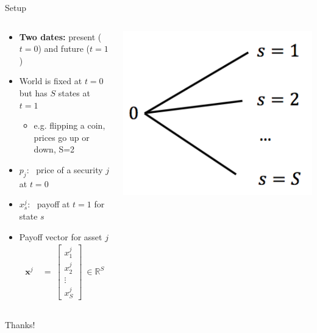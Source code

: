 \documentclass[9pt]{beamer}
\newcommand{\eq}{\ =\ }
\newcommand{\bb}{\mathbb}
\begin{document}
\begin{frame}{Setup}
\begin{columns}
\begin{column}{0.6\textwidth}
  \begin{itemize}
    \item {\bf Two dates:} present ($t=0$) and future ($t=1$)
    \item World is fixed at $t=0$ but has $S$ states at $t=1$
    \begin{itemize}
      \item e.g. flipping a coin, prices go up or down, S=2
    \end{itemize}
    \vspace{1ex}

    \item $p_j$: \ price of a security $j$ at $t=0$
    \item $x^j_s$: \ payoff at $t=1$ for state $s$
    \vspace{2ex}

    \item Payoff vector for asset $j$
    \begin{align*}
      \bm x^j & \eq
      \begin{bmatrix}
        x^j_1 \\
        x^j_2 \\
        \vdots \\
        x^j_S
      \end{bmatrix}
      \ \in \bb R^S
    \end{align*}
  \end{itemize}
\end{column}

\begin{column}{0.38\textwidth} \centering
  \includegraphics[width=.85\textwidth]{images/one-period.PNG}
\end{column}
\end{columns}
\end{frame}


\begin{frame}
\huge{Thanks!}
\end{frame}
\end{document}
